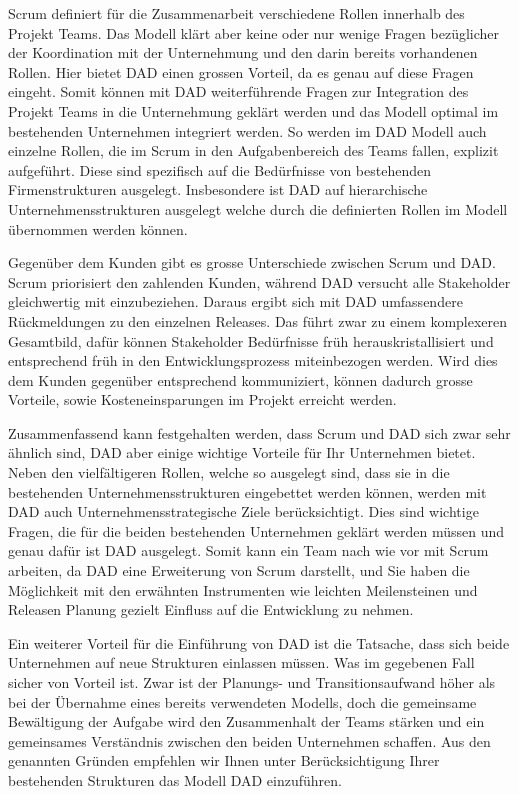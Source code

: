 Scrum definiert für die Zusammenarbeit verschiedene Rollen innerhalb des Projekt Teams. Das Modell klärt aber keine oder nur wenige Fragen bezüglicher der Koordination mit der Unternehmung und den darin bereits vorhandenen Rollen. Hier bietet DAD einen grossen Vorteil, da es genau auf diese Fragen eingeht. Somit können mit DAD weiterführende Fragen zur Integration des Projekt Teams in die Unternehmung geklärt werden und das Modell optimal im bestehenden Unternehmen integriert werden. So werden im DAD Modell auch einzelne Rollen, die im Scrum in den Aufgabenbereich des Teams fallen, explizit aufgeführt. Diese sind spezifisch auf die Bedürfnisse von bestehenden Firmenstrukturen ausgelegt. Insbesondere ist DAD auf hierarchische Unternehmensstrukturen ausgelegt welche durch die definierten Rollen im Modell übernommen werden können.


Gegenüber dem Kunden gibt es grosse Unterschiede zwischen Scrum und DAD. Scrum priorisiert den zahlenden Kunden, während DAD versucht alle Stakeholder gleichwertig mit einzubeziehen. Daraus ergibt sich mit DAD umfassendere Rückmeldungen zu den einzelnen Releases. Das führt zwar zu einem komplexeren Gesamtbild, dafür können Stakeholder Bedürfnisse früh herauskristallisiert und entsprechend früh in den Entwicklungsprozess miteinbezogen werden. Wird dies dem Kunden gegenüber entsprechend kommuniziert, können dadurch grosse Vorteile, sowie Kosteneinsparungen im Projekt erreicht werden. 

Zusammenfassend kann festgehalten werden, dass Scrum und DAD sich zwar sehr ähnlich sind, DAD aber einige wichtige Vorteile für Ihr Unternehmen bietet. Neben den vielfältigeren Rollen, welche so ausgelegt sind, dass sie in die bestehenden Unternehmensstrukturen eingebettet werden können, werden mit DAD auch Unternehmensstrategische Ziele berücksichtigt. Dies sind wichtige Fragen, die für die beiden bestehenden Unternehmen geklärt werden müssen und genau dafür ist DAD ausgelegt. Somit kann ein Team nach wie vor mit Scrum arbeiten, da DAD eine Erweiterung von Scrum darstellt, und Sie haben die Möglichkeit mit den erwähnten Instrumenten wie leichten Meilensteinen und Releasen Planung gezielt Einfluss auf die Entwicklung zu nehmen.

Ein weiterer Vorteil für die Einführung von DAD ist die Tatsache, dass sich beide Unternehmen auf neue Strukturen einlassen müssen. Was im gegebenen Fall sicher von Vorteil ist. Zwar ist der Planungs- und Transitionsaufwand höher als bei der Übernahme eines bereits verwendeten Modells, doch die gemeinsame Bewältigung der Aufgabe wird den Zusammenhalt der Teams stärken und ein gemeinsames Verständnis zwischen den beiden Unternehmen schaffen. Aus den genannten Gründen empfehlen wir Ihnen unter Berücksichtigung Ihrer bestehenden Strukturen das Modell DAD einzuführen.

